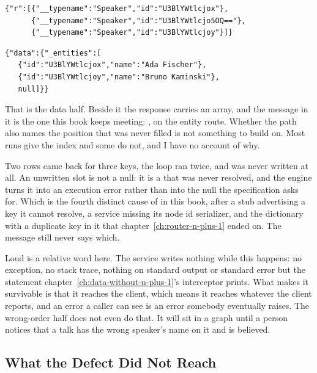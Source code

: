 \begin{verbatim}
{"r":[{"__typename":"Speaker","id":"U3BlYWtlcjox"},
      {"__typename":"Speaker","id":"U3BlYWtlcjo5OQ=="},
      {"__typename":"Speaker","id":"U3BlYWtlcjoy"}]}
\end{verbatim}

\begin{verbatim}
{"data":{"_entities":[
   {"id":"U3BlYWtlcjox","name":"Ada Fischer"},
   {"id":"U3BlYWtlcjoy","name":"Bruno Kaminski"},
   null]}}
\end{verbatim}

%
That is the data half. Beside it the response carries an  array,
and the message in it is the one this book keeps meeting:
, on the entity route. Whether the path also
names the position that was never filled is not something to build on. Most
runs give the index and some do not, and I have no account of why.

%
Two rows came back for three keys, the loop ran twice, and
 was never written at all. An unwritten slot is not a
null: it is a  that was never resolved, and the engine turns it
into an execution error rather than into the null the specification asks for.
Which is the fourth distinct cause of  in this
book, after a stub advertising a key it cannot resolve, a service missing its
node id serializer, and the dictionary with a duplicate key in it that
chapter~\ref{ch:router-n-plus-1} ended on. The message still never says which.

%
Loud is a relative word here. The service writes nothing while this happens:
no exception, no stack trace, nothing on standard output or standard error but
the statement chapter~\ref{ch:data-without-n-plus-1}'s interceptor prints. What
makes it survivable is that it reaches the client, which means it reaches
whatever the client reports, and an error a caller can see is an error somebody
eventually raises. The wrong-order half does not even do that. It will sit in a
graph until a person notices that a talk has the wrong speaker's name on it and
is believed.

\subsection{What the Defect Did Not Reach}

